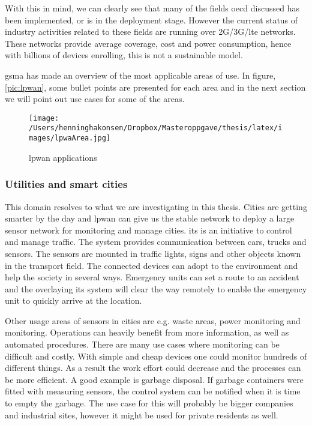 \documentclass[USenglish]{ifimaster}  %
\begin{document}
With this in mind, we can clearly see that many of the fields \acrshort{oecd} discussed has been implemented, or is in the deployment stage. However the current status of industry activities related to these fields are running over 2G/3G/\acrshort{lte} networks. These networks provide average coverage, cost and power consumption, hence with billions of devices enrolling, this is not a sustainable model.

\acrfull{gsma} has made an overview of the most applicable areas of use. In figure, \vref{pic:lpwan}, some bullet points are presented for each area and in the next section we will point out use cases for some of the areas.

\begin{figure}[ht]
  \centering\texttt{[image: /Users/henninghakonsen/Dropbox/Masteroppgave/thesis/latex/images/lpwaArea.jpg]}
  \caption[\acrshort{lpwan} applications]{\acrshort{lpwan} applications \cite{online:lpwaFuture}}
  \label{pic:lpwan}
\end{figure}

\subsubsection{Utilities and smart cities}
This domain resolves to what we are investigating in this thesis. Cities are getting smarter by the day and \acrshort{lpwan} can give us the stable network to deploy a large sensor network for monitoring and manage cities. \acrfull{its} is an initiative to control and manage traffic. The system provides communication between cars, trucks and sensors. The sensors are mounted in traffic lights, signs and other objects known in the transport field. The connected devices can adopt to the environment and help the society in several ways. Emergency units can set a route to an accident and the overlaying \acrshort{its} system will clear the way remotely to enable the emergency unit to quickly arrive at the location.

Other usage areas of sensors in cities are e.g. waste areas, power monitoring and  monitoring. Operations can heavily benefit from more information, as well as automated procedures. There are many use cases where monitoring can be difficult and costly. With simple and cheap devices one could monitor hundreds of different things. As a result the work effort could decrease and the processes can be more efficient. A good example is garbage disposal. If garbage containers were fitted with measuring sensors, the control system can be notified when it is time to empty the garbage. The use case for this will probably be bigger companies and industrial sites, however it might be used for private residents as well.
\end{document}
